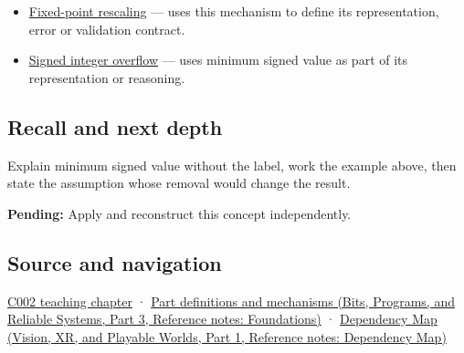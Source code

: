 \hypertarget{appendix-05f39b10364d-used-by}{}

\begin{itemize}
\item
  \hyperref[appendix-3333db47830f]{Fixed-point rescaling} --- uses this mechanism to define its representation, error or validation contract.
\item
  \hyperref[appendix-1a599c924a4e]{Signed integer overflow} --- uses minimum signed value as part of its representation or reasoning.
\end{itemize}

\subsection{Recall and next depth}\label{appendix-05f39b10364d-recall-and-next-depth}

\hypertarget{appendix-05f39b10364d-recall-and-next-depth}{}

Explain minimum signed value without the label, work the example above, then state the assumption whose removal would change the result.

\textbf{Pending:} Apply and reconstruct this concept independently.

\subsection{Source and navigation}\label{appendix-05f39b10364d-source-and-navigation}

\hypertarget{appendix-05f39b10364d-source-and-navigation}{}

\hyperref[01-foundations-i-ch001-arithmetic-becomes-a-policy]{C002 teaching chapter} · \href{../01-Bits-Programs-and-Reliable-Systems-P03/main.pdf\#appendix-fd090d982a15}{Part definitions and mechanisms (Bits, Programs, and Reliable Systems, Part 3, Reference notes: Foundations)} · \href{../07-Vision-XR-and-Playable-Worlds-P01/main.pdf\#appendix-4ad47bdd269a}{Dependency Map (Vision, XR, and Playable Worlds, Part 1, Reference notes: Dependency Map)}
